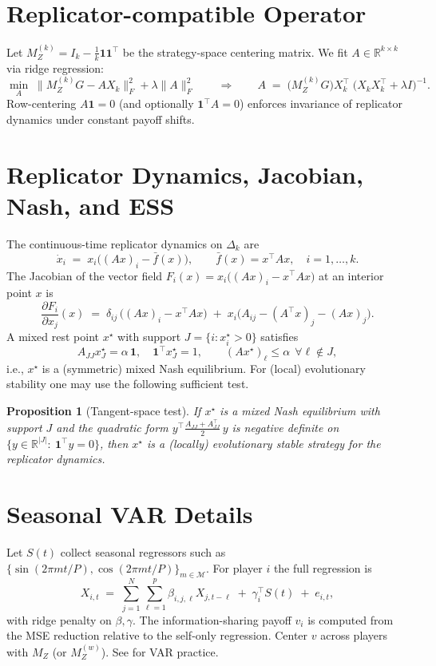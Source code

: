 \documentclass[11pt]{article}
\newtheorem{proposition}{Proposition}
\newcommand{\one}{\mathbf{1}}
\newcommand{\R}{\mathbb{R}}
\begin{document}
\section{Replicator-compatible Operator}
Let $M_Z^{(k)}=I_k-\tfrac{1}{k}\one\one^\top$ be the strategy-space centering matrix. We fit $A\in\R^{k\times k}$ via ridge regression:
\begin{equation}
\label{eq:ridge-A}
\min_A \;\big\|M_Z^{(k)}G - A X_k\big\|_F^2 + \lambda\|A\|_F^2
\qquad\Longrightarrow\qquad
A \;=\; \big(M_Z^{(k)}G\big)X_k^\top\;\big(X_k X_k^\top + \lambda I\big)^{-1}.
\end{equation}
Row-centering $A\one=0$ (and optionally $\one^\top A=0$) enforces invariance of replicator dynamics under constant payoff shifts.

\section{Replicator Dynamics, Jacobian, Nash, and ESS}
The continuous-time replicator dynamics on $\Delta_k$ are
\begin{equation}
\dot x_i \;=\; x_i \Big((Ax)_i - \bar f(x)\Big),\qquad \bar f(x)=x^\top A x,\quad i=1,\dots,k.
\end{equation}
The Jacobian of the vector field $F_i(x)=x_i\big((Ax)_i - x^\top A x\big)$ at an interior point $x$ is
\begin{equation}
\frac{\partial F_i}{\partial x_j}(x) \;=\; \delta_{ij}\,\big((Ax)_i - x^\top A x\big) \;+\; x_i\Big(A_{ij} - (A^\top x)_j - (Ax)_j\Big).
\end{equation}
A mixed rest point $x^\star$ with support $J=\{i:x^\star_i>0\}$ satisfies
\begin{equation}
A_{JJ} x^\star_J = \alpha\,\one,\quad \one^\top x^\star_J=1,\qquad (Ax^\star)_\ell \le \alpha\ \ \forall \ell\notin J,
\end{equation}
i.e., $x^\star$ is a (symmetric) mixed Nash equilibrium. For (local) evolutionary stability one may use the following sufficient test.
\begin{proposition}[Tangent-space test]
If $x^\star$ is a mixed Nash equilibrium with support $J$ and the quadratic form
\(
y^\top \frac{A_{JJ}+A_{JJ}^\top}{2}\, y
\)
is negative definite on $\{y\in\R^{|J|}:\ \one^\top y=0\}$, then $x^\star$ is a (locally) evolutionary stable strategy for the replicator dynamics.
\end{proposition}

\section{Seasonal VAR Details}
Let $S(t)$ collect seasonal regressors such as $\{\sin(2\pi m t/P),\cos(2\pi m t/P)\}_{m\in \mathcal{M}}$. For player $i$ the full regression is
\begin{equation}
X_{i,t} \;=\; \sum_{j=1}^N \sum_{\ell=1}^p \beta_{i,j,\ell} X_{j,t-\ell} \;+\; \gamma_i^\top S(t) \;+\; e_{i,t},
\end{equation}
with ridge penalty on $\beta,\gamma$. The information-sharing payoff $v_i$ is computed from the MSE reduction relative to the self-only regression. Center $v$ across players with $M_Z$ (or $M_Z^{(w)}$). See \cite{lutkepohl} for VAR practice.
\end{document}

